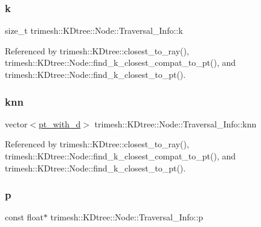 \subsubsection{\texorpdfstring{k}{k}}
{\footnotesize\ttfamily size\+\_\+t trimesh\+::\+K\+Dtree\+::\+Node\+::\+Traversal\+\_\+\+Info\+::k}



Referenced by trimesh\+::\+K\+Dtree\+::closest\+\_\+to\+\_\+ray(), trimesh\+::\+K\+Dtree\+::\+Node\+::find\+\_\+k\+\_\+closest\+\_\+compat\+\_\+to\+\_\+pt(), and trimesh\+::\+K\+Dtree\+::\+Node\+::find\+\_\+k\+\_\+closest\+\_\+to\+\_\+pt().

\mbox{\label{structtrimesh_1_1KDtree_1_1Node_1_1Traversal__Info_a3dcf9e4adb34d06b87ffb44b2e2fc337}} 
\subsubsection{\texorpdfstring{knn}{knn}}
{\footnotesize\ttfamily vector$<$\hyperlink{namespacetrimesh_ab64100c6e8b0f92c8b80af7e509bd6d9}{pt\+\_\+with\+\_\+d}$>$ trimesh\+::\+K\+Dtree\+::\+Node\+::\+Traversal\+\_\+\+Info\+::knn}



Referenced by trimesh\+::\+K\+Dtree\+::closest\+\_\+to\+\_\+ray(), trimesh\+::\+K\+Dtree\+::\+Node\+::find\+\_\+k\+\_\+closest\+\_\+compat\+\_\+to\+\_\+pt(), and trimesh\+::\+K\+Dtree\+::\+Node\+::find\+\_\+k\+\_\+closest\+\_\+to\+\_\+pt().

\mbox{\label{structtrimesh_1_1KDtree_1_1Node_1_1Traversal__Info_a297a6f379987e53da7395e6a9498e16c}} 
\subsubsection{\texorpdfstring{p}{p}}
{\footnotesize\ttfamily const float$\ast$ trimesh\+::\+K\+Dtree\+::\+Node\+::\+Traversal\+\_\+\+Info\+::p}



